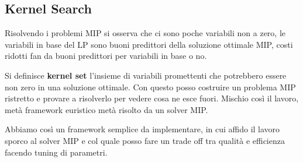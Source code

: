 \subsection{Kernel Search}
Risolvendo i problemi MIP si osserva che ci sono poche variabili non a zero, le variabili in base del LP sono buoni predittori della soluzione ottimale MIP, costi ridotti fan da buoni predittori per variabili in base o no.

Si definisce \textbf{kernel set} l'insieme di variabili promettenti che potrebbero essere non zero in una soluzione ottimale. Con questo posso costruire un problema MIP ristretto e provare a risolverlo per vedere cosa ne esce fuori. Mischio così il lavoro, metà framework euristico metà risolto da un solver MIP. 

Abbiamo così un framework semplice da implementare, in cui affido il lavoro sporco al solver MIP e col quale posso fare un trade off tra qualità e efficienza facendo tuning di parametri. 

